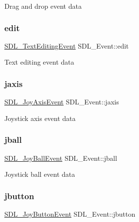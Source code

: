 Drag and drop event data \mbox{\label{union_s_d_l___event_a9a7e3b67b2654d4c5fc509676c6a7183}} 
\subsubsection{\texorpdfstring{edit}{edit}}
{\footnotesize\ttfamily \mbox{\hyperlink{struct_s_d_l___text_editing_event}{S\+D\+L\+\_\+\+Text\+Editing\+Event}} S\+D\+L\+\_\+\+Event\+::edit}

Text editing event data \mbox{\label{union_s_d_l___event_ac4611acd0e9c675e67dc20919f0accb4}} 
\subsubsection{\texorpdfstring{jaxis}{jaxis}}
{\footnotesize\ttfamily \mbox{\hyperlink{struct_s_d_l___joy_axis_event}{S\+D\+L\+\_\+\+Joy\+Axis\+Event}} S\+D\+L\+\_\+\+Event\+::jaxis}

Joystick axis event data \mbox{\label{union_s_d_l___event_ae433f511e3383d17f8fe02df745ee8f8}} 
\subsubsection{\texorpdfstring{jball}{jball}}
{\footnotesize\ttfamily \mbox{\hyperlink{struct_s_d_l___joy_ball_event}{S\+D\+L\+\_\+\+Joy\+Ball\+Event}} S\+D\+L\+\_\+\+Event\+::jball}

Joystick ball event data \mbox{\label{union_s_d_l___event_a591104d64903ae1cf70874fb5d3124ff}} 
\subsubsection{\texorpdfstring{jbutton}{jbutton}}
{\footnotesize\ttfamily \mbox{\hyperlink{struct_s_d_l___joy_button_event}{S\+D\+L\+\_\+\+Joy\+Button\+Event}} S\+D\+L\+\_\+\+Event\+::jbutton}

